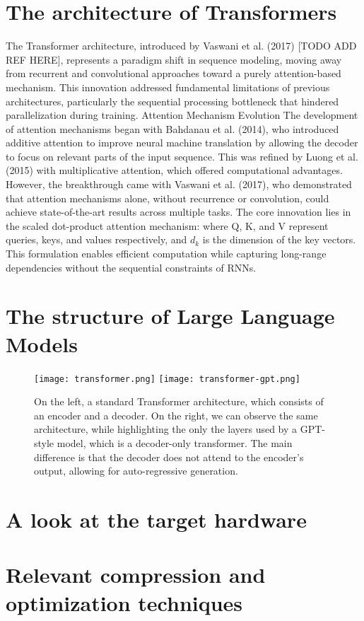 \section{The architecture of Transformers} \label{transformer_architecture}
The Transformer architecture, introduced by Vaswani et al. (2017) [TODO ADD REF HERE], represents a paradigm shift in sequence modeling, moving away from recurrent and convolutional approaches toward a purely attention-based mechanism. This innovation addressed fundamental limitations of previous architectures, particularly the sequential processing bottleneck that hindered parallelization during training.
Attention Mechanism Evolution
The development of attention mechanisms began with Bahdanau et al. (2014), who introduced additive attention to improve neural machine translation by allowing the decoder to focus on relevant parts of the input sequence. This was refined by Luong et al. (2015) with multiplicative attention, which offered computational advantages. However, the breakthrough came with Vaswani et al. (2017), who demonstrated that attention mechanisms alone, without recurrence or convolution, could achieve state-of-the-art results across multiple tasks.
The core innovation lies in the scaled dot-product attention mechanism:
where Q, K, and V represent queries, keys, and values respectively, and $d_{k}$ is the dimension of the key vectors. This formulation enables efficient computation while capturing long-range dependencies without the sequential constraints of RNNs.

\section{The structure of Large Language Models}

\begin{figure}[htbp]
    \centering
    \texttt{[image: transformer.png]}
    \hfill
    \texttt{[image: transformer-gpt.png]}
    \caption{On the left, a standard Transformer architecture, which consists of an encoder and a decoder. On the right, we can observe the same architecture, while highlighting the only the layers used by a GPT-style model, which is a decoder-only transformer. The main difference is that the decoder does not attend to the encoder's output, allowing for auto-regressive generation.}
    \label{fig:sidebyside}
\end{figure}

\section{A look at the target hardware}

\section{Relevant compression and optimization techniques}


